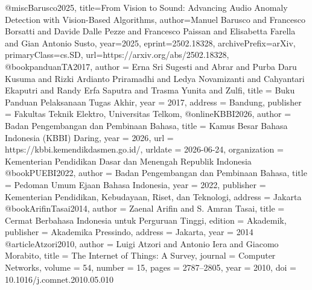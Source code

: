 @misc{Barusco2025,
      title={From Vision to Sound: Advancing Audio Anomaly Detection with Vision-Based Algorithms}, 
      author={Manuel Barusco and Francesco Borsatti and Davide Dalle Pezze and Francesco Paissan and Elisabetta Farella and Gian Antonio Susto},
      year={2025},
      eprint={2502.18328},
      archivePrefix={arXiv},
      primaryClass={cs.SD},
      url={https://arxiv.org/abs/2502.18328}, 
}%
@book{panduanTA2017,
  author = {Erna Sri Sugesti and Abrar and Purba Daru Kusuma and Rizki Ardianto Priramadhi and Ledya Novamizanti and Cahyantari Ekaputri and Randy Erfa Saputra and Trasma Yunita and Zulfi},
  title = {Buku Panduan Pelaksanaan Tugas Akhir},
  year = {2017},
  address = {Bandung},
  publisher = {Fakultas Teknik Elektro, Universitas Telkom},
}
@online{KBBI2026,
  author       = {{Badan Pengembangan dan Pembinaan Bahasa}},
  title        = {Kamus Besar Bahasa Indonesia (KBBI) Daring},
  year         = {2026},
  url          = {https://kbbi.kemendikdasmen.go.id/},
  urldate      = {2026-06-24},
  organization = {Kementerian Pendidikan Dasar dan Menengah Republik Indonesia}
}
@book{PUEBI2022,
  author    = {{Badan Pengembangan dan Pembinaan Bahasa}},
  title     = {Pedoman Umum Ejaan Bahasa Indonesia},
  year      = {2022},
  publisher = {Kementerian Pendidikan, Kebudayaan, Riset, dan Teknologi},
  address   = {Jakarta}
}
@book{ArifinTasai2014,
  author    = {Zaenal Arifin and S. Amran Tasai},
  title     = {Cermat Berbahasa Indonesia untuk Perguruan Tinggi},
  edition   = {Akademik},
  publisher = {Akademika Pressindo},
  address   = {Jakarta},
  year      = {2014}
}
@article{Atzori2010,
  author  = {Luigi Atzori and Antonio Iera and Giacomo Morabito},
  title   = {The Internet of Things: A Survey},
  journal = {Computer Networks},
  volume   = {54},
  number   = {15},
  pages    = {2787--2805},
  year     = {2010},
  doi      = {10.1016/j.comnet.2010.05.010}
}
